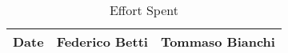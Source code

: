 \begin{table}[H]	
	\centering
	\def\arraystretch{1.25}
	\begin{tabular}{|m{5cm}|m{5cm}|m{5cm}|}
		\hline
		\textbf{Date} & \textbf{Federico Betti} & \textbf{Tommaso Bianchi} \\ \hline
	\end{tabular}
	\caption{Effort Spent}
\end{table}

